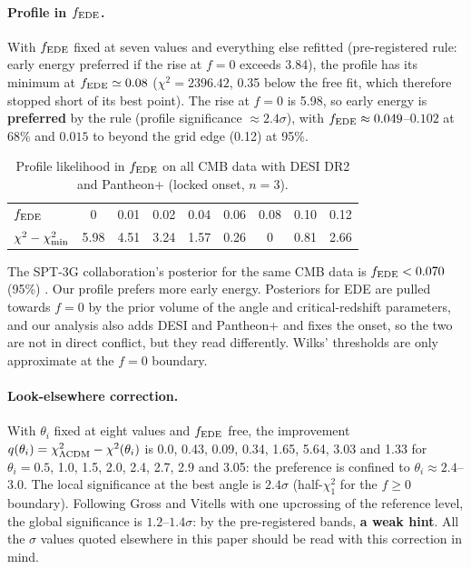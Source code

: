 \documentclass[11pt]{article}
\begin{document}
\paragraph{Profile in $f_{\rm EDE}$.} With $f_{\rm EDE}$ fixed at seven values and everything else refitted
(pre-registered rule: early energy preferred if the rise at $f=0$ exceeds 3.84), the profile has its minimum at
$f_{\rm EDE}\simeq0.08$ ($\chi^2=2396.42$, 0.35 below the free fit, which therefore stopped short of its best point).
The rise at $f=0$ is 5.98, so early energy is \textbf{preferred} by the rule (profile significance $\approx2.4\sigma$),
with $f_{\rm EDE}\approx0.049$--$0.102$ at 68\% and $0.015$ to beyond the grid edge (0.12) at 95\%.

\begin{table}[h]
\centering
\small
\begin{tabular}{lcccccccc}
\toprule
$f_{\rm EDE}$ & 0 & 0.01 & 0.02 & 0.04 & 0.06 & 0.08 & 0.10 & 0.12\\
$\chi^2-\chi^2_{\rm min}$ & 5.98 & 4.51 & 3.24 & 1.57 & 0.26 & 0 & 0.81 & 2.66\\
\bottomrule
\end{tabular}
\caption{Profile likelihood in $f_{\rm EDE}$ on all CMB data with DESI DR2 and Pantheon+ (locked onset, $n=3$).}
\label{tab:profile_f}
\end{table}

The SPT-3G collaboration's posterior for the same CMB data is $f_{\rm EDE}<0.070$ (95\%) \cite{khalife2025}. Our
profile prefers more early energy. Posteriors for EDE are pulled towards $f=0$ by the prior volume of the angle and
critical-redshift parameters, and our analysis also adds DESI and Pantheon+ and fixes the onset, so the two are not
in direct conflict, but they read differently. Wilks' thresholds are only approximate at the $f=0$ boundary.

\paragraph{Look-elsewhere correction.} With $\theta_i$ fixed at eight values and $f_{\rm EDE}$ free, the improvement
$q(\theta_i)=\chi^2_{\Lambda{\rm CDM}}-\chi^2(\theta_i)$ is 0.0, 0.43, 0.09, 0.34, 1.65, 5.64, 3.03 and 1.33 for
$\theta_i=0.5$, 1.0, 1.5, 2.0, 2.4, 2.7, 2.9 and 3.05: the preference is confined to $\theta_i\approx2.4$--$3.0$. The
local significance at the best angle is $2.4\sigma$ (half-$\chi^2_1$ for the $f\ge0$ boundary). Following Gross and
Vitells \cite{grossvitells2010} with one upcrossing of the reference level, the global significance is
$1.2$--$1.4\sigma$: by the pre-registered bands, \textbf{a weak hint}. All the $\sigma$ values quoted elsewhere in this
paper should be read with this correction in mind.
\end{document}
